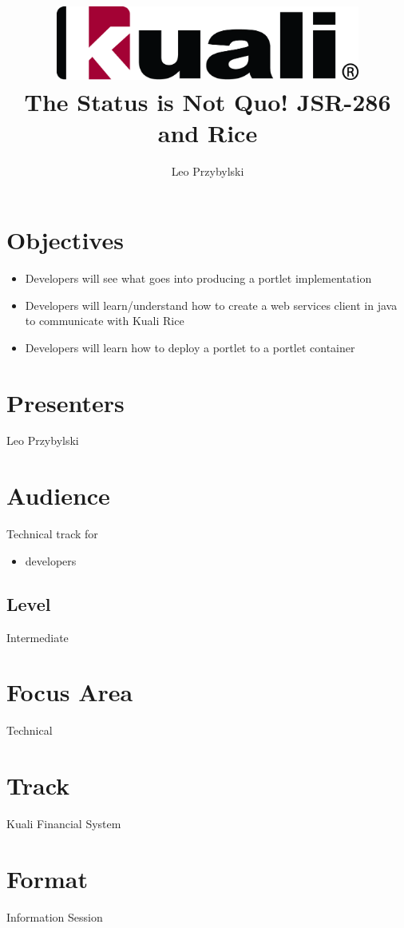 \documentclass[12pt,notitlepage]{article}
\author{Leo Przybylski}
\title{\includegraphics[width=0.75\textwidth]{kuali_base.png}\\The Status is Not Quo! JSR-286 and Rice}
\date{}
\begin{document}
\maketitle
{}
\section{Objectives}
\begin{itemize}
\item Developers will see what goes into producing a portlet implementation
\item Developers will learn/understand how to create a web services client in java to communicate with Kuali Rice
\item Developers will learn how to deploy a portlet to a portlet
  container
\end{itemize}

\section{Presenters}
Leo Przybylski

\section{Audience}
Technical track for
\begin{itemize}
\item developers
\end{itemize}


\subsection{Level}
Intermediate

\section{Focus Area}
Technical

\section{Track}
Kuali Financial System

\section{Format}
Information Session
\end{document}
